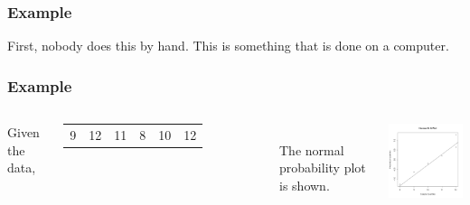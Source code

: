 \begin{frame}
  \frametitle{Example}

  First, nobody does this by hand. {\color{red}This is something that
    is done on a computer.}  

  
  
\end{frame}

\begin{frame}
  \frametitle{Example}


  \begin{columns}

    Given the data, \\
    \begin{tabular}{llllll}
      9 & 12 & 11 & 8 & 10 & 12
    \end{tabular} \\
    The normal probability plot is shown.


  \includegraphics[width=5cm]{img/normalQQEx2}

  \end{columns}
  
  
\end{frame}

